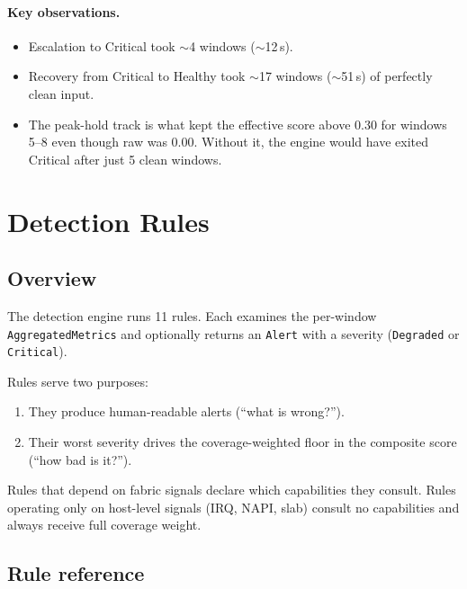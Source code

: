 \documentclass[11pt]{article}
\begin{document}
\paragraph{Key observations.}
\begin{itemize}[nosep]
  \item Escalation to Critical took $\sim$4 windows ($\sim$12\,s).
  \item Recovery from Critical to Healthy took $\sim$17 windows ($\sim$51\,s)
        of perfectly clean input.
  \item The peak-hold track is what kept the effective score above 0.30 for
        windows 5--8 even though raw was 0.00. Without it, the engine would
        have exited Critical after just 5 clean windows.
\end{itemize}


\section{Detection Rules}
\label{sec:rules}

\subsection{Overview}

The detection engine runs 11 rules. Each examines the per-window
\texttt{AggregatedMetrics} and optionally returns an \texttt{Alert} with a
severity (\texttt{Degraded} or \texttt{Critical}).

Rules serve two purposes:
\begin{enumerate}[nosep]
  \item They produce human-readable alerts (``what is wrong?'').
  \item Their worst severity drives the coverage-weighted floor in the
        composite score (``how bad is it?'').
\end{enumerate}

Rules that depend on fabric signals declare which capabilities they consult.
Rules operating only on host-level signals (IRQ, NAPI, slab) consult no
capabilities and always receive full coverage weight.

\subsection{Rule reference}
\end{document}
